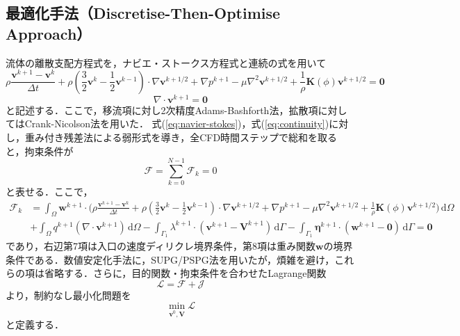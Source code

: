 \documentclass[a4paper,xelatex,ja=standard]{bxjsarticle}
\begin{document}
\subsection{最適化手法（Discretise-Then-Optimise Approach）}
流体の離散支配方程式を，ナビエ・ストークス方程式と連続の式を用いて
\begin{equation}
    \label{eq:navier-stokes}
    \rho\frac{\mathbf{v}^{k+1}-\mathbf{v}^k}{\Delta t} + \rho\left( \frac{3}{2}\mathbf{v}^k - \frac{1}{2}\mathbf{v}^{k-1} \right) \cdot \nabla \mathbf{v}^{k+1 / 2} + \nabla p^{k+1} - \mu \nabla^2 \mathbf{v}^{k+1/2} + \frac{1}{\rho}\mathbf{K}(\phi) \mathbf{v}^{k+1/2} = \mathbf{0}
\end{equation}
\begin{equation}
    \label{eq:continuity}
    \nabla \cdot \mathbf{v}^{k+1}=\mathbf{0}
\end{equation}
と記述する．ここで，移流項に対し2次精度Adams-Bashforth法，拡散項に対してはCrank-Nicolson法を用いた．
式(\ref{eq:navier-stokes})，式(\ref{eq:continuity})に対し，重み付き残差法による弱形式を導き，全CFD時間ステップで総和を取ると，拘束条件が
\begin{equation}
    \label{eq:weak-form}
    \mathcal{F}=\sum_{k=0}^{N-1} \mathcal{F}_{k} = 0
\end{equation}
と表せる．ここで，
\begin{equation}
    \label{eq:weak-form-k}
    \begin{aligned}
        \mathcal{F}_{k} & = \int_{\Omega} \mathbf{w}^{k+1} \cdot \bigg(\rho\frac{\mathbf{v}^{k+1}-\mathbf{v}^k}{\Delta t} + \rho\left(\frac{3}{2}\mathbf{v}^k - \frac{1}{2}\mathbf{v}^{k-1} \right) \cdot \nabla \mathbf{v}^{k+1 / 2} + \nabla p^{k+1} - \mu \nabla^2 \mathbf{v}^{k+1/2} + \frac{1}{\rho}\mathbf{K}(\phi) \mathbf{v}^{k+1/2} \bigg) \, \mathrm{d}\Omega \\
        &+ \int_{\Omega} q^{k+1}(\nabla \cdot \mathbf{v}^{k+1}) \, \mathrm{d}\Omega - \int_{\Gamma_1} \lambda^{k+1} \cdot (\mathbf{v}^{k+1} - \mathbf{V}^{k+1}) \, \mathrm{d}\Gamma - \int_{\Gamma_1} \boldsymbol{\eta}^{k+1} \cdot (\mathbf{w}^{k+1} - \mathbf{0}) \, \mathrm{d}\Gamma = \mathbf{0}
    \end{aligned}
\end{equation}
であり，右辺第7項は入口の速度ディリクレ境界条件，第8項は重み関数$\mathbf{w}$の境界条件である．数値安定化手法に，SUPG/PSPG法を用いたが，煩雑を避け，これらの項は省略する．さらに，目的関数・拘束条件を合わせたLagrange関数
\begin{equation}
    \label{eq:lagrange}
    \mathcal{L} = \mathcal{F} + \mathcal{J}
\end{equation}
より，制約なし最小化問題を
\begin{equation}
    \label{eq:minimization}
    \min_{\mathbf{v}^{0}, \mathbf{V}} \mathcal{L}
\end{equation}
と定義する．
\end{document}
